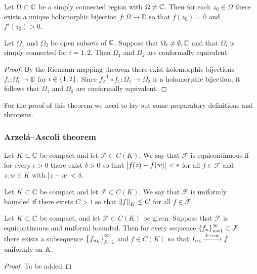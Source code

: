 \documentclass[11pt,a4paper]{article}
\begin{document}
\begin{theorem}
  Let $\Omega \subset \mathbb{C}$ be a simply connected region with $\Omega \neq \mathbb{C}$.
  Then for each $z_0 \in \Omega$ there exists a unique holomorphic bijection
  $f \colon \Omega \to \mathbb D$ so that $f(z_0) = 0$ and $f'(z_0) > 0$.
\end{theorem}

\begin{corollary}
  Let $\Omega_1$ and $\Omega_2$ be open subsets of $\mathbb{C}$.
  Suppose that $\Omega_i \neq \emptyset,\mathbb{C}$ and that $\Omega_i$ is simply
  connected for $i = 1,2$.
  Then $\Omega_1$ and $\Omega_2$ are conformally equivalent.
\end{corollary}
\begin{proof}
  By the Riemann mapping theorem there exist holomorphic bijections
  $f_i \colon \Omega_i \to \mathbb D$ for $i \in \left\{1,2\right\}$.
  Since $f_2^{-1} \circ f_1 \colon \Omega_1 \to \Omega_2$ is a holomorphic
  bijection, it follows that $\Omega_1$ and $\Omega_2$ are conformally
  equivalent.
\end{proof}

\begin{remark}
For the proof of this theorem we need to lay out some preparatory
definitions and theorems.
\end{remark}

\subsubsection{Arzel\'a--Ascoli theorem}

\begin{definition}[Equicontinuity]
  Let $K \subset \mathbb{C}$ be compact and let $\mathcal F \subset C(K)$.
  We say that $\mathcal F$ is equicontinuous if for every $\epsilon > 0$
  there exist $\delta > 0$ so that $\left\lvert f(z) - f(w)\right\rvert < \epsilon$ for
  all $f \in \mathcal F$ and $z,w \in K$ with $\left\lvert z - w\right\rvert < \delta$.
\end{definition}

\begin{definition}
  Let $K \subset \mathbb{C}$ be compact and let $\mathcal F \subset C(K)$.
  We say that $\mathcal F$ is uniformly bounded if there exists $C > 1$
  so that $\left\lVert f\right\rVert_{K} \le C$ for all $f \in \mathcal F$.
\end{definition}

\begin{theorem}
  Let $K \subset \mathbb{C}$ be compact, and let $\mathcal F \subset C(K)$ be given.
  Suppose that $\mathcal F$ is equicontinuous and uniforml bounded.
  Then for every sequence $\left\{f_n\right\}_{n=1}^{\infty} \subset \mathcal F$
  there exists a subsequence $\left\{f_{n_k}\right\}_{k=1}^{\infty}$ and $f \in C(K)$
  so that $f_{n_k} \xrightarrow{k \to \infty} f$ uniformly on $K$.
\end{theorem}
\begin{proof}
  To be added
\end{proof}
\end{document}
